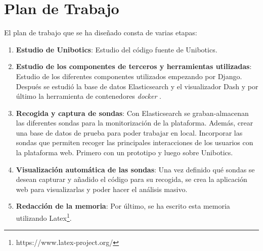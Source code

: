 \section{Plan de Trabajo}
El plan de trabajo que se ha diseñado consta de varias etapas:

\begin{enumerate}
\item \textbf{Estudio de Unibotics}: Estudio del código fuente de Unibotics.
\item \textbf{Estudio de los componentes de terceros y herramientas utilizadas}: Estudio de los diferentes componentes utilizados empezando por Django. Después se estudió la base de datos Elasticsearch y el visualizador Dash y por último la herramienta de contenedores \textit{docker} .\newpage
\item \textbf{Recogida y captura de sondas}: Con Elasticsearch se graban-almacenan las diferentes sondas para la monitorización de la plataforma. Además, crear una base de datos de prueba para poder trabajar en local. Incorporar las sondas que permiten recoger las principales interacciones de los usuarios con la plataforma web. Primero con un prototipo y luego sobre Unibotics.
\item \textbf{Visualización automática de las sondas}: Una vez definido qué sondas se desean capturar y añadido el código para su recogida, se crea la aplicación web para visualizarlas y poder hacer el análisis masivo.
\item \textbf{Redacción de la memoria}: Por último, se ha escrito esta memoria utilizando Latex\footnote{https://www.latex-project.org/}.
\end{enumerate}








